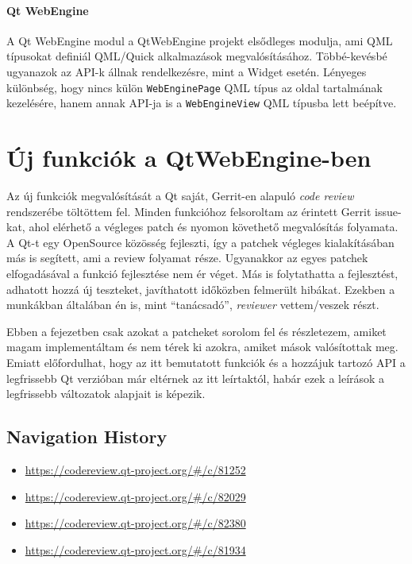 \documentclass[12pt]{report}
\let\origurl\url
\renewcommand{\url}[1]{%
    \textcolor{blue}{\origurl{#1}}
}
\newcommand{\gerrit}[1]{%
    \textcolor{qtgreen}{\origurl{https://codereview.qt-project.org/\#/c/#1}}
}
\begin{document}
\subsubsection{Qt WebEngine}
A Qt WebEngine modul \cite{bib:qt-doc-qt-webengine-quick} a QtWebEngine projekt elsődleges
modulja, ami QML típusokat definiál QML/Quick alkalmazások megvalósításához. Többé-kevésbé
ugyanazok az API-k állnak rendelkezésre, mint a Widget esetén. Lényeges különbség, hogy nincs
külön \texttt{WebEnginePage} QML típus az oldal tartalmának kezelésére, hanem annak API-ja is
a \texttt{WebEngineView} QML típusba lett beépítve.


\chapter{Új funkciók a QtWebEngine-ben}
\label{chap:features}

Az új funkciók megvalósítását a Qt saját, Gerrit-en alapuló \textit{code review} rendszerébe
töltöttem fel. Minden funkcióhoz felsoroltam az érintett Gerrit issue-kat, ahol elérhető
a végleges patch és nyomon követhető megvalósítás folyamata. A Qt-t egy OpenSource
közösség fejleszti, így a patchek végleges kialakításában más is segített, ami a review
folyamat része. Ugyanakkor az egyes patchek elfogadásával a funkció fejlesztése nem
ér véget. Más is folytathatta a fejlesztést, adhatott hozzá új teszteket, javíthatott
időközben felmerült hibákat. Ezekben a munkákban általában én is, mint ``tanácsadó'',
\textit{reviewer} vettem/veszek részt.

Ebben a fejezetben csak azokat a patcheket sorolom fel és részletezem, amiket magam
implementáltam és nem térek ki azokra, amiket mások valósítottak meg. Emiatt előfordulhat,
hogy az itt bemutatott funkciók és a hozzájuk tartozó API a legfrissebb Qt verzióban
már eltérnek az itt leírtaktól, habár ezek a leírások a legfrissebb változatok alapjait
is képezik.

\section{Navigation History}

\begin{center}
    \begin{reviewbox}
        \begin{itemize}
            \renewcommand{\labelitemi}{\textcolor{qtgreen}{$\blacktriangleright$}}
            \item \gerrit{81252}
            \item \gerrit{82029}
            \item \gerrit{82380}
            \item \gerrit{81934}
        \end{itemize}
    \end{reviewbox}
\end{center}
\end{document}
